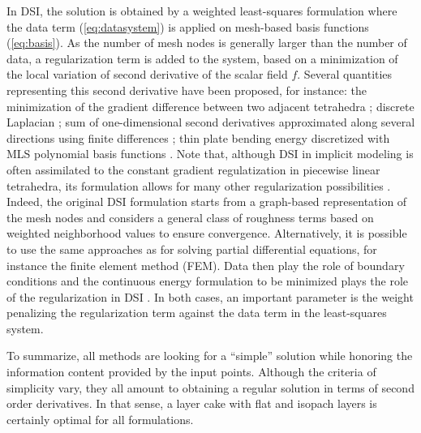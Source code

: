 \documentclass[preprint]{ring20}
\begin{document}
{In DSI, the solution is obtained by a weighted least-squares formulation where the data term (\ref{eq:datasystem}) is applied on mesh-based basis functions (\ref{eq:basis}). As the number of mesh nodes is generally larger than the number of data, a regularization term is added to the system, based on a minimization of the local variation of second derivative of the scalar field $f$. Several quantities representing this second derivative have been proposed, for instance: the minimization of the gradient difference between two adjacent tetrahedra \citep{Frank2007CG}; discrete Laplacian \citep{Irakarama2018EAGE}; sum of one-dimensional second derivatives approximated along several directions using finite differences \citep{Irakarama2018EAGE}; thin plate bending energy discretized with MLS polynomial basis functions \citep{Renaudeau2019MG}. Note that, although DSI in implicit modeling is often assimilated to the constant gradient regulatization in piecewise linear tetrahedra, its formulation allows for many other regularization possibilities \citep{Mallet1992CD}. Indeed, the original DSI formulation starts from a graph-based representation of the mesh nodes and considers a general class of roughness terms based on weighted neighborhood values to ensure convergence. Alternatively, it is possible to use the same approaches as for solving partial differential equations, for instance the finite element method (FEM). Data then play the role of boundary conditions and the continuous energy formulation to be minimized plays the role of the regularization in DSI \citep{Renaudeau2019MG}. In both cases, an important parameter is the weight penalizing the regularization term against the data term in the least-squares system. 

To summarize, all methods are looking for a ``simple'' solution while honoring the information content provided by the input points. Although the criteria of simplicity vary, they all amount to obtaining a regular solution in terms of second order derivatives. In that sense, a layer cake with flat and isopach layers is certainly optimal for all formulations. 

}
\end{document}
